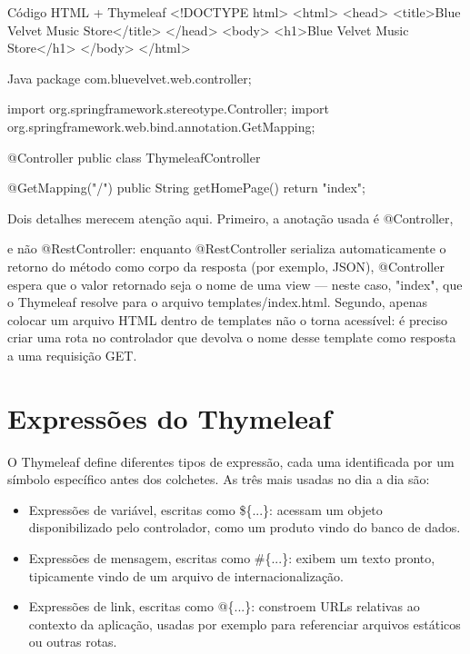 \begin{codebox}{Código}
HTML + Thymeleaf
<!DOCTYPE html>
<html>
<head>
<title>Blue Velvet Music Store</title>
</head>
<body>
<h1>Blue Velvet Music Store</h1>
</body>
</html>
\end{codebox}

\begin{codebox}{Java}
 package com.bluevelvet.web.controller;

 import org.springframework.stereotype.Controller;
 import org.springframework.web.bind.annotation.GetMapping;

 @Controller
 public class ThymeleafController {

        @GetMapping("/")
        public String getHomePage() {
            return "index";
        }
 }


   Dois detalhes merecem atenção aqui. Primeiro, a anotação usada é @Controller,
\end{codebox}

e não @RestController: enquanto @RestController serializa automaticamente o retorno do método como corpo da resposta (por exemplo, JSON), @Controller espera que o valor retornado seja o nome de uma view — neste caso, "index", que o Thymeleaf resolve para o arquivo templates/index.html. Segundo, apenas colocar um arquivo HTML dentro de templates não o torna acessível: é preciso criar uma rota no controlador que devolva o nome desse template como resposta a uma requisição GET.

\section{Expressões do Thymeleaf}

O Thymeleaf define diferentes tipos de expressão, cada uma identificada por um símbolo específico antes dos colchetes. As três mais usadas no dia a dia são:

\begin{itemize}
  \item Expressões de variável, escritas como \$\{...\}: acessam um objeto disponibilizado pelo controlador, como um produto vindo do banco de dados.
  \item Expressões de mensagem, escritas como \#\{...\}: exibem um texto pronto, tipicamente vindo de um arquivo de internacionalização.
  \item Expressões de link, escritas como @\{...\}: constroem URLs relativas ao contexto da aplicação, usadas por exemplo para referenciar arquivos estáticos ou outras rotas.
\end{itemize}

